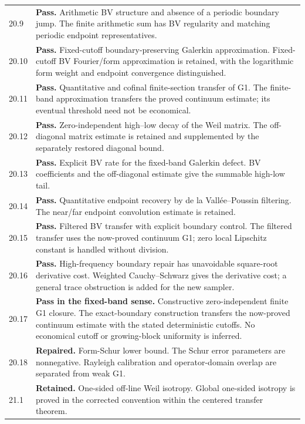 \documentclass[11pt]{article}
\theoremstyle{remark}
\begin{document}
\begin{longtable}{@{}p{}p{}@{}}
20.9 & \textbf{Pass.} Arithmetic BV structure and absence of a periodic boundary jump. The finite arithmetic sum has BV regularity and matching periodic endpoint representatives. \\[4pt]
20.10 & \textbf{Pass.} Fixed-cutoff boundary-preserving Galerkin approximation. Fixed-cutoff BV Fourier/form approximation is retained, with the logarithmic form weight and endpoint convergence distinguished. \\[4pt]
20.11 & \textbf{Pass.} Quantitative and cofinal finite-section transfer of G1. The finite-band approximation transfers the proved continuum estimate; its eventual threshold need not be economical. \\[4pt]
20.12 & \textbf{Pass.} Zero-independent high--low decay of the Weil matrix. The off-diagonal matrix estimate is retained and supplemented by the separately restored diagonal bound. \\[4pt]
20.13 & \textbf{Pass.} Explicit BV rate for the fixed-band Galerkin defect. BV coefficients and the off-diagonal estimate give the summable high-low tail. \\[4pt]
20.14 & \textbf{Pass.} Quantitative endpoint recovery by de la Vall\'ee--Poussin filtering. The near/far endpoint convolution estimate is retained. \\[4pt]
20.15 & \textbf{Pass.} Filtered BV transfer with explicit boundary control. The filtered transfer uses the now-proved continuum G1; zero local Lipschitz constant is handled without division. \\[4pt]
20.16 & \textbf{Pass.} High-frequency boundary repair has unavoidable square-root derivative cost. Weighted Cauchy--Schwarz gives the derivative cost; a general trace obstruction is added for the new sampler. \\[4pt]
20.17 & \textbf{Pass in the fixed-band sense.} Constructive zero-independent finite G1 closure. The exact-boundary construction transfers the now-proved continuum estimate with the stated deterministic cutoffs. No economical cutoff or growing-block uniformity is inferred. \\[4pt]
20.18 & \textbf{Repaired.} Form-Schur lower bound. The Schur error parameters are nonnegative. Rayleigh calibration and operator-domain overlap are separated from weak G1. \\[4pt]
21.1 & \textbf{Retained.} One-sided off-line Weil isotropy. Global one-sided isotropy is proved in the corrected convention within the centered transfer theorem. \\[4pt]

\end{longtable}
\end{document}
